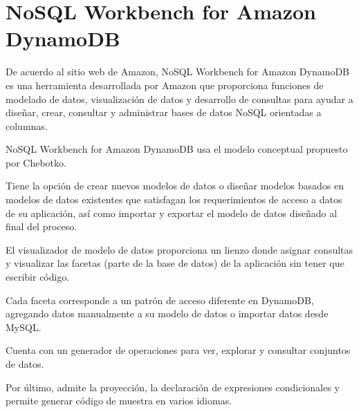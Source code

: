 \section{NoSQL Workbench for Amazon DynamoDB}

De acuerdo al sitio web de Amazon\cite{amazon_nosql_2020}, NoSQL Workbench for Amazon DynamoDB es una herramienta desarrollada por Amazon que proporciona funciones de modelado de datos, visualización de datos y desarrollo de consultas para ayudar a diseñar, crear, consultar y administrar bases de datos NoSQL orientadas a columnas.


NoSQL Workbench for Amazon DynamoDB usa el modelo conceptual propuesto por Chebotko\cite{chebotko_big_2015}.


Tiene la opción de crear nuevos modelos de datos o diseñar modelos basados ​​en modelos de datos existentes que satisfagan los requerimientos de acceso a datos de su aplicación, así como importar y exportar el modelo de datos diseñado al final del proceso. 


El visualizador de modelo de datos proporciona un lienzo donde asignar consultas y visualizar las facetas (parte de la base de datos) de la aplicación sin tener que escribir código.


Cada faceta corresponde a un patrón de acceso diferente en DynamoDB, agregando datos manualmente a su modelo de datos o importar datos desde MySQL. 


Cuenta con un generador de operaciones para ver, explorar y consultar conjuntos de datos.


Por último, admite la proyección, la declaración de expresiones condicionales y permite generar código de muestra en varios idiomas.

